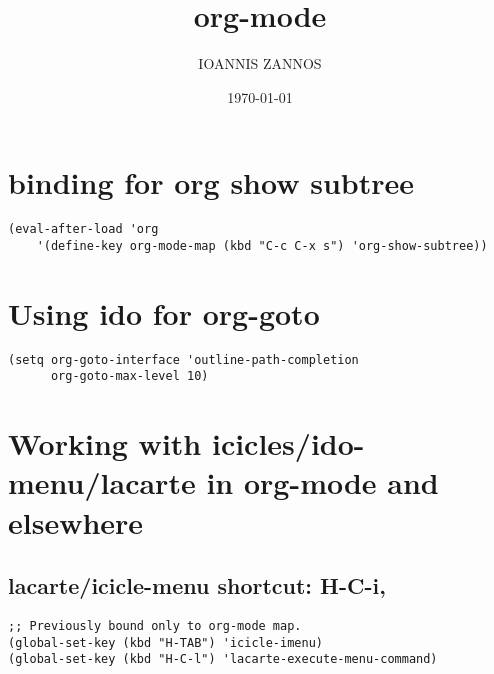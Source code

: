 \documentclass[10pt]{article}
\author{IOANNIS ZANNOS}
\date{\today}
\title{org-mode}
\begin{document}
\maketitle
\tableofcontents

\section{binding for org show subtree}
\label{sec-1}

\begin{verbatim}
(eval-after-load 'org
    '(define-key org-mode-map (kbd "C-c C-x s") 'org-show-subtree))
\end{verbatim}

\section{Using ido for org-goto}
\label{sec-2}

\begin{verbatim}
(setq org-goto-interface 'outline-path-completion
      org-goto-max-level 10)
\end{verbatim}

\section{Working with icicles/ido-menu/lacarte in org-mode and elsewhere}
\label{sec-3}
\subsection{lacarte/icicle-menu shortcut: H-C-i,}
\label{sec-3-1}
\begin{verbatim}
;; Previously bound only to org-mode map.
(global-set-key (kbd "H-TAB") 'icicle-imenu)
(global-set-key (kbd "H-C-l") 'lacarte-execute-menu-command)
\end{verbatim}
\end{document}
